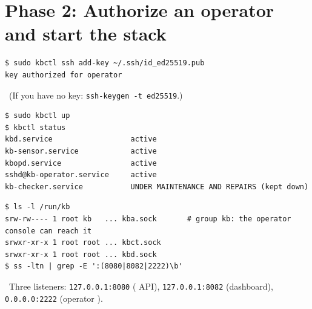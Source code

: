 \section{Phase 2: Authorize an operator and start the stack}
\resetsteps
{}
\begin{lstlisting}[style=console]
$ sudo kbctl ssh add-key ~/.ssh/id_ed25519.pub
key authorized for operator
\end{lstlisting}
\verified\ (If you have no key: \texttt{ssh-keygen -t ed25519}.)
\begin{lstlisting}[style=console]
$ sudo kbctl up
$ kbctl status
kbd.service                  active
kb-sensor.service            active
kbopd.service                active
sshd@kb-operator.service     active
kb-checker.service           UNDER MAINTENANCE AND REPAIRS (kept down)
\end{lstlisting}
\verified
{}
\begin{lstlisting}[style=console]
$ ls -l /run/kb
srw-rw---- 1 root kb   ... kba.sock       # group kb: the operator console can reach it
srwxr-xr-x 1 root root ... kbct.sock
srwxr-xr-x 1 root root ... kbd.sock
$ ss -ltn | grep -E ':(8080|8082|2222)\b'
\end{lstlisting}
\verified\ Three listeners: \texttt{127.0.0.1:8080} ( API), \texttt{127.0.0.1:8082} (dashboard), \texttt{0.0.0.0:2222} (operator ).

